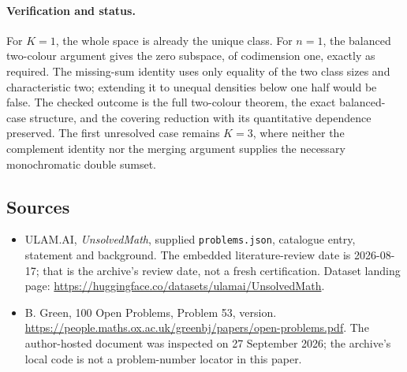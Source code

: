 \documentclass[11pt,a4paper]{article}
\begin{document}
\paragraph{Verification and status.}
For $K=1$, the whole space is already the unique class. For $n=1$, the balanced two-colour argument gives the zero subspace, of codimension one, exactly as required. The missing-sum identity uses only equality of the two class sizes and characteristic two; extending it to unequal densities below one half would be false. The checked outcome is the full two-colour theorem, the exact balanced-case structure, and the covering reduction with its quantitative dependence preserved. The first unresolved case remains $K=3$, where neither the complement identity nor the merging argument supplies the necessary monochromatic double sumset.

\subsection{Sources}

{\small

\begin{itemize}

\item[\hypertarget{source:statement:1}{S1}] ULAM.AI, \emph{UnsolvedMath}, supplied \texttt{problems.json}, catalogue entry, statement and background. The embedded literature-review date is 2026-08-17; that is the archive’s review date, not a fresh certification. Dataset landing page: \url{https://huggingface.co/datasets/ulamai/UnsolvedMath}.

\item[\hypertarget{source:statement:2}{S2}] B. Green, 100 Open Problems, Problem 53, version. \url{https://people.maths.ox.ac.uk/greenbj/papers/open-problems.pdf}. The author-hosted document was inspected on 27 September 2026; the archive’s local code is not a problem-number locator in this paper.

\end{itemize}

}

\label{end:statement}
\end{document}
